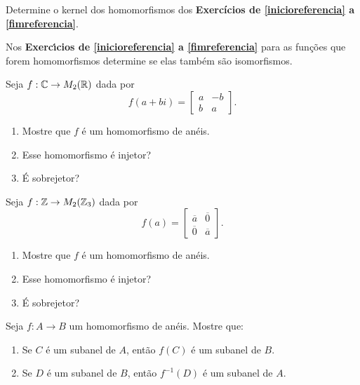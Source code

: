 \documentclass[12pt]{exam}
\begin{document}
\vspace{.3cm}

\questao{} Determine o kernel dos homomorfismos dos \textbf{Exerc{\'i}cios de \ref{inicioreferencia} a \ref{fimreferencia}}.

\vspace{.3cm}

\questao{} Nos \textbf{Exerc{\'\i}cios de \ref{inicioreferencia} a \ref{fimreferencia}} para as fun\c{c}\~oes que forem homomorfismos determine se elas tamb\'em s\~ao isomorfismos.

\vspace{.3cm}

\questao{} Seja $f : \mathbb{C} \to M_2(\mathbb{R})$ dada por
\[
	f(a + bi) = \begin{bmatrix}
		a & -b\\
		b & a
	\end{bmatrix}.
\]
\begin{enumerate}[label=({\alph*})]
	\item Mostre que $f$ \'e um homomorfismo de an\'eis.
	\item Esse homomorfismo \'e injetor?
	\item \'E sobrejetor?
\end{enumerate}

\vspace{.3cm}

\questao{} Seja $f : \mathbb{Z} \to M_2(\mathbb{Z}_3)$ dada por
\[
	f(a) = \begin{bmatrix}
		\overline{a} & \overline{0}\\
		\overline{0} & \overline{a}
	\end{bmatrix}.
\]
\begin{enumerate}[label=({\alph*})]
	\item Mostre que $f$ \'e um homomorfismo de an\'eis.
	\item Esse homomorfismo \'e injetor?
	\item \'E sobrejetor?
\end{enumerate}

\vspace{.3cm}

\questao{} Seja $f: A \to B$ um homomorfismo de an{\'e}is. Mostre que:
\begin{enumerate}[label=({\alph*})]
\item Se $C$  {\'e} um subanel de $A$, ent{\~a}o $f(C)$ {\'e} um subanel de $B$.
\item Se $D$ {\'e} um subanel de $B$, ent{\~a}o $f^{-1}(D)$ {\'e} um subanel de $A$.
\end{enumerate}
\end{document}
